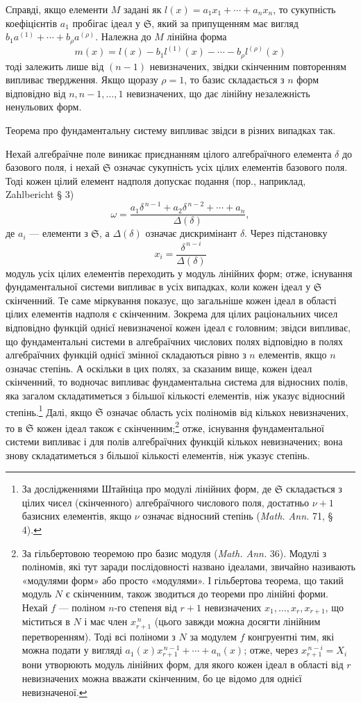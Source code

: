 \documentclass[11pt]{article}
\providecommand{\frS}{\mathfrak S}
\begin{document}
Справді, якщо елементи \(M\) задані як \(l(x)=a_1x_1+\cdots+a_nx_n\), то сукупність коефіцієнтів \(a_1\) пробігає ідеал у \(\frS\), який за припущенням має вигляд \(b_1a^{(1)}+\cdots+b_\rho a^{(\rho)}\). Належна до \(M\) лінійна форма
\[
m(x)=l(x)-b_1l^{(1)}(x)-\cdots-b_\rho l^{(\rho)}(x)
\]
тоді залежить лише від \((n-1)\) невизначених, звідки скінченним повторенням випливає твердження. Якщо щоразу \(\rho=1\), то базис складається з \(n\) форм відповідно від \(n,n-1,\ldots,1\) невизначених, що дає лінійну незалежність ненульових форм.

Теорема про фундаментальну систему випливає звідси в різних випадках так.

Нехай алгебраїчне поле виникає приєднанням цілого алгебраїчного елемента \(\delta\) до базового поля, і нехай \(\frS\) означає сукупність усіх цілих елементів базового поля. Тоді кожен цілий елемент надполя допускає подання (пор., наприклад, Zahlbericht § 3)
\[
\omega=\frac{a_1\delta^{\,n-1}+a_2\delta^{\,n-2}+\cdots+a_n}{\Delta(\delta)},
\]
де \(a_i\) --- елементи з \(\frS\), а \(\Delta(\delta)\) означає дискримінант \(\delta\). Через підстановку
\[
x_i=\frac{\delta^{\,n-i}}{\Delta(\delta)}
\]
модуль усіх цілих елементів переходить у модуль лінійних форм; отже, існування фундаментальної системи випливає в усіх випадках, коли кожен ідеал у \(\frS\) скінченний. Те саме міркування показує, що загальніше кожен ідеал в області цілих елементів надполя є скінченним. Зокрема для цілих раціональних чисел відповідно функцій однієї невизначеної кожен ідеал є головним; звідси випливає, що фундаментальні системи в алгебраїчних числових полях відповідно в полях алгебраїчних функцій однієї змінної складаються рівно з \(n\) елементів, якщо \(n\) означає степінь. А оскільки в цих полях, за сказаним вище, кожен ідеал скінченний, то водночас випливає фундаментальна система для відносних полів, яка загалом складатиметься з більшої кількості елементів, ніж указує відносний степінь.\footnote{За дослідженнями Штайніца про модулі лінійних форм, де \(\frS\) складається з цілих чисел (скінченного) алгебраїчного числового поля, достатньо \(\nu+1\) базисних елементів, якщо \(\nu\) означає відносний степінь (\emph{Math. Ann.} 71, § 4).} Далі, якщо \(\frS\) означає область усіх поліномів від кількох невизначених, то в \(\frS\) кожен ідеал також є скінченним;\footnote{За гільбертовою теоремою про базис модуля (\emph{Math. Ann.} 36). Модулі з поліномів, які тут заради послідовності названо ідеалами, звичайно називають «модулями форм» або просто «модулями». І гільбертова теорема, що такий модуль \(N\) є скінченним, також зводиться до теореми про лінійні форми. Нехай \(f\) --- поліном \(n\)-го степеня від \(r+1\) невизначених \(x_1,\ldots,x_r,x_{r+1}\), що міститься в \(N\) і має член \(x_{r+1}^{\,n}\) (цього завжди можна досягти лінійним перетворенням). Тоді всі поліноми з \(N\) за модулем \(f\) конгруентні тим, які можна подати у вигляді \(a_1(x)x_{r+1}^{\,n-1}+\cdots+a_n(x)\); отже, через \(x_{r+1}^{\,n-i}=X_i\) вони утворюють модуль лінійних форм, для якого кожен ідеал в області від \(r\) невизначених можна вважати скінченним, бо це відомо для однієї невизначеної.} отже, існування фундаментальної системи випливає і для полів алгебраїчних функцій кількох невизначених; вона знову складатиметься з більшої кількості елементів, ніж указує степінь.
\end{document}
